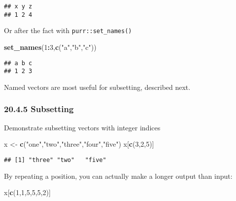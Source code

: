 \documentclass[
]{article}
\newenvironment{Shaded}{\begin{snugshade}}{\end{snugshade}}
\newcommand{\DecValTok}[1]{\textcolor[rgb]{0.00,0.00,0.81}{#1}}
\newcommand{\FunctionTok}[1]{\textcolor[rgb]{0.13,0.29,0.53}{\textbf{#1}}}
\newcommand{\NormalTok}[1]{#1}
\newcommand{\OtherTok}[1]{\textcolor[rgb]{0.56,0.35,0.01}{#1}}
\newcommand{\SpecialCharTok}[1]{\textcolor[rgb]{0.81,0.36,0.00}{\textbf{#1}}}
\newcommand{\StringTok}[1]{\textcolor[rgb]{0.31,0.60,0.02}{#1}}
\begin{document}
\begin{verbatim}
## x y z 
## 1 2 4
\end{verbatim}

Or after the fact with \texttt{purr::set\_names()}

\begin{Shaded}
\begin{Highlighting}[]
\FunctionTok{set\_names}\NormalTok{(}\DecValTok{1}\SpecialCharTok{:}\DecValTok{3}\NormalTok{,}\FunctionTok{c}\NormalTok{(}\StringTok{"a"}\NormalTok{,}\StringTok{"b"}\NormalTok{,}\StringTok{"c"}\NormalTok{))}
\end{Highlighting}
\end{Shaded}

\begin{verbatim}
## a b c 
## 1 2 3
\end{verbatim}

Named vectors are most useful for subsetting, described next.

\hypertarget{subsetting-1}{%
\subsubsection{20.4.5 Subsetting}\label{subsetting-1}}

Demonstrate subsetting vectors with integer indices

\begin{Shaded}
\begin{Highlighting}[]
\NormalTok{x }\OtherTok{\textless{}{-}} \FunctionTok{c}\NormalTok{(}\StringTok{"one"}\NormalTok{,}\StringTok{"two"}\NormalTok{,}\StringTok{"three"}\NormalTok{,}\StringTok{"four"}\NormalTok{,}\StringTok{"five"}\NormalTok{)}
\NormalTok{x[}\FunctionTok{c}\NormalTok{(}\DecValTok{3}\NormalTok{,}\DecValTok{2}\NormalTok{,}\DecValTok{5}\NormalTok{)]}
\end{Highlighting}
\end{Shaded}

\begin{verbatim}
## [1] "three" "two"   "five"
\end{verbatim}

By repeating a position, you can actually make a longer output than
input:

\begin{Shaded}
\begin{Highlighting}[]
\NormalTok{x[}\FunctionTok{c}\NormalTok{(}\DecValTok{1}\NormalTok{,}\DecValTok{1}\NormalTok{,}\DecValTok{5}\NormalTok{,}\DecValTok{5}\NormalTok{,}\DecValTok{5}\NormalTok{,}\DecValTok{2}\NormalTok{)]}
\end{Highlighting}
\end{Shaded}
\end{document}
